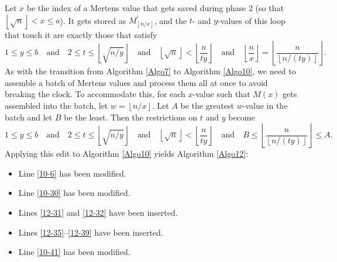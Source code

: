 \documentclass[12pt]{article}
\newcommand{\eqn}[1]{\begin{displaymath} #1 \end{displaymath}}
\newcommand{\neqn}[1]{\begin{equation} #1 \end{equation}}
\newcommand{\floor}[1]{{\left\lfloor #1 \right\rfloor}}
\newcommand{\quadtext}[1]{\quad \text{#1} \quad}
\newcommand{\floordiv}[2]{\floor{\frac{#1}{#2}}}
\newcommand{\isqrt}[1]{\floor{\sqrt{#1}}}
\begin{document}
Let $x$ be the index of a Mertens value that gets saved during phase 2 (so that $\isqrt{n} < x \leq a$).  It gets stored as $M^\prime_\floor{n/x}$, and the $t$- and $y$-values of this loop that touch it are exactly those that satisfy
\eqn{1 \leq y \leq b \quadtext{and} 2 \leq t \leq \isqrt{n/y} \quadtext{and} \isqrt{n} < \floordiv{n}{ty} \quadtext{and} \floordiv{n}{x} = \floordiv{n}{\floor{n/(ty)}}.}
As with the transition from Algorithm \ref{Algo7} to Algorithm \ref{Algo10}, we need to assemble a batch of Mertens values and process them all at once to avoid breaking the clock.  To accommodate this, for each $x$-value such that $M(x)$ gets assembled into the batch, let $w=\floor{n/x}$.  Let $A$ be the greatest $w$-value in the batch and let $B$ be the least.  Then the restrictions on $t$ and $y$ become
\neqn{1 \leq y \leq b \quadtext{and} 2 \leq t \leq \isqrt{n/y} \quadtext{and} \isqrt{n} < \floordiv{n}{ty} \quadtext{and} B \leq \floordiv{n}{\floor{n/(ty)}} \leq A. \label{cbafnlj}}
Applying this edit to Algorithm \ref{Algo10} yields Algorithm \ref{Algo12}:
\begin{itemize}
\item Line \ref{10-6} has been modified.
\item Line \ref{10-30} has been modified.
\item Lines \ref{12-31} and \ref{12-32} have been inserted.
\item Lines \ref{12-35}--\ref{12-39} have been inserted.
\item Line \ref{10-41} has been modified.
\end{itemize}
\end{document}

